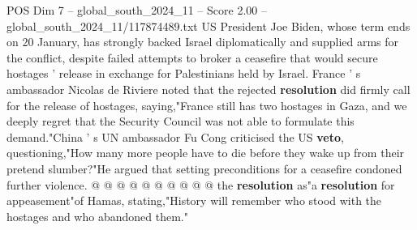 \begin{textsample}{POS Dim 7 – global\_south\_2024\_11 – Score 2.00 – global\_south\_2024\_11/117874489.txt}
US President Joe Biden, whose term ends on 20 January, has strongly backed Israel diplomatically and supplied arms for the conflict, despite failed attempts to broker a ceasefire that would secure hostages ' release in exchange for Palestinians held by Israel.
France ' s ambassador Nicolas de Riviere noted that the rejected \textbf{resolution} did firmly call for the release of hostages, saying,"France still has two hostages in Gaza, and we deeply regret that the Security Council was not able to formulate this demand."China ' s UN ambassador Fu Cong criticised the US \textbf{veto}, questioning,"How many more people have to die before they wake up from their pretend slumber?"He argued that setting preconditions for a ceasefire condoned further violence. @ @ @ @ @ @ @ @ @ @ the \textbf{resolution} as"a \textbf{resolution} for appeasement"of Hamas, stating,"History will remember who stood with the hostages and who abandoned them."

\end{textsample}
